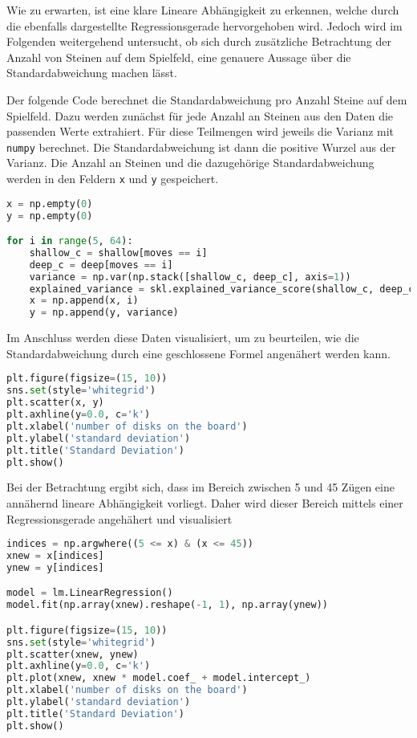 Wie zu erwarten, ist eine klare Lineare Abhängigkeit zu erkennen, welche
durch die ebenfalls dargestellte Regressionsgerade hervorgehoben wird.
Jedoch wird im Folgenden weitergehend untersucht, ob sich durch
zusätzliche Betrachtung der Anzahl von Steinen auf dem Spielfeld, eine
genauere Aussage über die Standardabweichung machen lässt.

Der folgende Code berechnet die Standardabweichung pro Anzahl Steine auf
dem Spielfeld. Dazu werden zunächst für jede Anzahl an Steinen aus den
Daten die passenden Werte extrahiert. Für diese Teilmengen wird jeweils
die Varianz mit \passthrough{\lstinline!numpy!} berechnet. Die
Standardabweichung ist dann die positive Wurzel aus der Varianz. Die
Anzahl an Steinen und die dazugehörige Standardabweichung werden in den
Feldern \passthrough{\lstinline!x!} und \passthrough{\lstinline!y!}
gespeichert.

\begin{lstlisting}[language=Python]
x = np.empty(0)
y = np.empty(0)

for i in range(5, 64):
    shallow_c = shallow[moves == i]
    deep_c = deep[moves == i]
    variance = np.var(np.stack([shallow_c, deep_c], axis=1))
    explained_variance = skl.explained_variance_score(shallow_c, deep_c)
    x = np.append(x, i)
    y = np.append(y, variance)
\end{lstlisting}

Im Anschluss werden diese Daten visualisiert, um zu beurteilen, wie die
Standardabweichung durch eine geschlossene Formel angenähert werden
kann.

\begin{lstlisting}[language=Python]
plt.figure(figsize=(15, 10))
sns.set(style='whitegrid')
plt.scatter(x, y)
plt.axhline(y=0.0, c='k')
plt.xlabel('number of disks on the board')
plt.ylabel('standard deviation')
plt.title('Standard Deviation')
plt.show()
\end{lstlisting}

Bei der Betrachtung ergibt sich, dass im Bereich zwischen 5 und 45 Zügen
eine annähernd lineare Abhängigkeit vorliegt. Daher wird dieser Bereich
mittels einer Regressionsgerade angehähert und visualisiert

\begin{lstlisting}[language=Python]
indices = np.argwhere((5 <= x) & (x <= 45))
xnew = x[indices]
ynew = y[indices]

model = lm.LinearRegression()
model.fit(np.array(xnew).reshape(-1, 1), np.array(ynew))

plt.figure(figsize=(15, 10))
sns.set(style='whitegrid')
plt.scatter(xnew, ynew)
plt.axhline(y=0.0, c='k')
plt.plot(xnew, xnew * model.coef_ + model.intercept_)
plt.xlabel('number of disks on the board')
plt.ylabel('standard deviation')
plt.title('Standard Deviation')
plt.show()
\end{lstlisting}

